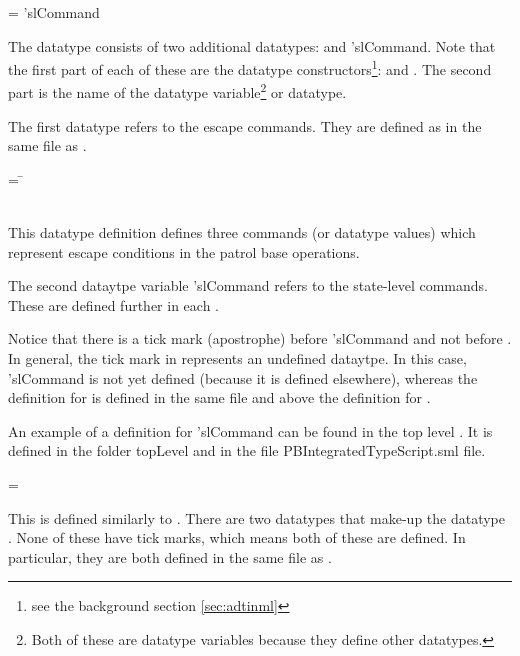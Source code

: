 \documentclass[../../main/main.tex]{subfiles}
\begin{document}
\begin{tabbing}
 =   \HOLTokenBar{}  'slCommand
\end{tabbing}

The  datatype consists of two additional datatypes:   and  'slCommand.  Note that the first part of each of these are the datatype constructors\footnote{see the background section \ref{sec:adtinml}}:  and .  The second part is the name of the datatype variable\footnote{Both of these are datatype variables because they define other datatypes.} or datatype.  

The first datatype refers to the escape commands.  They are defined as  in the same file as .

 \begin{tabbing}
  = \=  \\
 						\>\HOLTokenBar{}  \\
						\>\HOLTokenBar{} 
           \HOLTokenBar{} 
\end{tabbing}

This datatype definition defines three commands (or datatype values) which represent escape conditions in the patrol base operations.  

The second dataytpe variable 'slCommand refers to the state-level commands.  These are defined further in each .  

Notice that there is a tick mark (apostrophe) before 'slCommand and not before .  In general, the tick mark in  represents an undefined dataytpe.  In this case, 'slCommand is not yet defined (because it is defined elsewhere), whereas the definition for  is defined in the same file and above the definition for .   

An example of a definition for 'slCommand can be found in the top level .  It is defined in the folder topLevel and in the file PBIntegratedTypeScript.sml file.

 =   \HOLTokenBar{}  

This is defined similarly to .  There are two datatypes that make-up the datatype .  None of these have tick marks, which means both of these are defined.  In particular, they are both defined in the same file as .
\end{document}
